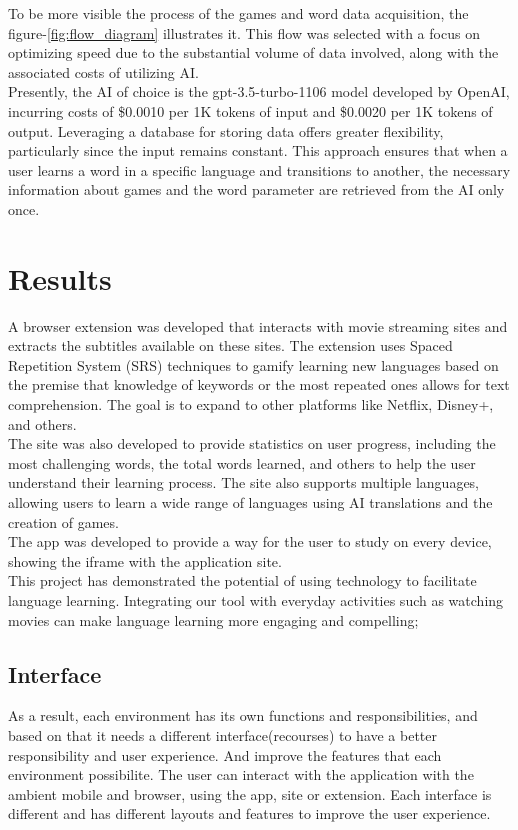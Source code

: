 \documentclass[12pt]{article}
\begin{document}
To be more visible the process of the games and word data acquisition, the figure-\ref{fig:flow_diagram} illustrates it. This flow was selected with a focus on optimizing speed due to the substantial volume of data involved, along with the associated costs of utilizing AI. \\
Presently, the AI of choice is the gpt-3.5-turbo-1106 model developed by OpenAI, incurring costs of \$0.0010 per 1K tokens of input and \$0.0020 per 1K tokens of output. Leveraging a database for storing data offers greater flexibility, particularly since the input remains constant. This approach ensures that when a user learns a word in a specific language and transitions to another, the necessary information about games and the word parameter are retrieved from the AI only once. 
\section{Results}
A browser extension was developed that interacts with movie streaming sites and extracts the subtitles available on these sites. The extension uses Spaced Repetition System (SRS) techniques to gamify learning new languages based on the premise that knowledge of keywords or the most repeated ones allows for text comprehension. The goal is to expand to other platforms like Netflix, Disney+, and others. \\ 
The site was also developed to provide statistics on user progress, including the most challenging words, the total words learned, and others to help the user understand their learning process. The site also supports multiple languages, allowing users to learn a wide range of languages using AI translations and the creation of games.  \\
The app was developed to provide a way for the user to study on every device, showing the iframe with the application site.\\
This project has demonstrated the potential of using technology to facilitate language learning. Integrating our tool with everyday activities such as watching movies can make language learning more engaging and compelling; 
\subsection{Interface}
As a result, each environment has its own functions and responsibilities, and based on that it needs a different interface(recourses) to have a better responsibility and user experience. And improve the features that each environment possibilite. The user can interact with the application with the ambient mobile and browser, using the app, site or extension. Each interface is different and has different layouts and features to improve the user experience. 
\end{document}

